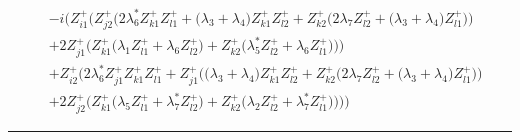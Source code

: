 \begin{align} 
 &-i \Big(Z_{{i 1}}^{+} \Big(Z_{{j 2}}^{+} \Big(2 \lambda_6^* Z_{{k 1}}^{+} Z_{{l 1}}^{+}  + \Big(\lambda_3 + \lambda_4\Big)Z_{{k 1}}^{+} Z_{{l 2}}^{+}  + Z_{{k 2}}^{+} \Big(2 \lambda_7 Z_{{l 2}}^{+}  + \Big(\lambda_3 + \lambda_4\Big)Z_{{l 1}}^{+} \Big)\Big)\nonumber \\ 
 &+2 Z_{{j 1}}^{+} \Big(Z_{{k 1}}^{+} \Big(\lambda_1 Z_{{l 1}}^{+}  + \lambda_6 Z_{{l 2}}^{+} \Big) + Z_{{k 2}}^{+} \Big(\lambda_5^* Z_{{l 2}}^{+}  + \lambda_6 Z_{{l 1}}^{+} \Big)\Big)\Big)\nonumber \\ 
 &+Z_{{i 2}}^{+} \Big(2 \lambda_6^* Z_{{j 1}}^{+} Z_{{k 1}}^{+} Z_{{l 1}}^{+} +Z_{{j 1}}^{+} \Big(\Big(\lambda_3 + \lambda_4\Big)Z_{{k 1}}^{+} Z_{{l 2}}^{+}  + Z_{{k 2}}^{+} \Big(2 \lambda_7 Z_{{l 2}}^{+}  + \Big(\lambda_3 + \lambda_4\Big)Z_{{l 1}}^{+} \Big)\Big)\nonumber \\ 
 &+2 Z_{{j 2}}^{+} \Big(Z_{{k 1}}^{+} \Big(\lambda_5 Z_{{l 1}}^{+}  + \lambda_7^* Z_{{l 2}}^{+} \Big) + Z_{{k 2}}^{+} \Big(\lambda_2 Z_{{l 2}}^{+}  + \lambda_7^* Z_{{l 1}}^{+} \Big)\Big)\Big)\Big)\end{align} 
\hrule 
